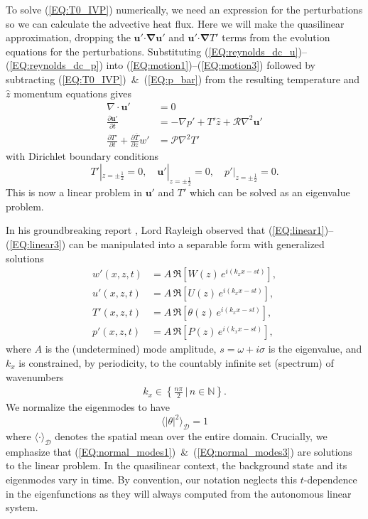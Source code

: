 \documentclass[reprint,amsmath,amssymb,aps,nofootinbib]{revtex4-1}
\renewcommand{\vec}[1]{\boldsymbol{#1}}
\newcommand{\eq}[1]{(\ref{#1})}
\newcommand{\eqs}[2]{(\ref{#1})~\&~(\ref{#2})}
\newcommand{\eqss}[2]{(\ref{#1})--(\ref{#2})}
\begin{document}
To solve \eq{EQ:T0_IVP} numerically, we need an expression for the perturbations so we can calculate the advective heat flux.
Here we will make the quasilinear approximation, dropping the $\vec{u}'\vec{\cdot}\vec{\nabla}\vec{u}'$ and $\vec{u}'\vec{\cdot}\vec{\nabla}T'$ terms from the evolution equations for the perturbations.
Substituting \eqss{EQ:reynolds_dc_u}{EQ:reynolds_dc_p} into \eqss{EQ:motion1}{EQ:motion3} followed by subtracting \eqs{EQ:T0_IVP}{EQ:p_bar} from the resulting temperature and $\hat{z}$ momentum equations gives
\begin{align}
    \nabla \cdot \vec{u'} &= 0 \label{EQ:linear1}\\
    \frac{\partial\vec{u'}}{\partial t} &= - \nabla p' + T'\hat{z} + \mathcal{R} \nabla^2 \vec{u'} \label{EQ:linear2}\\
    \frac{\partial T'}{\partial t} + \frac{\partial \overline{T}}{\partial z} w' &= \mathcal{P} \nabla^2 T' \label{EQ:linear3}
\end{align}
with Dirichlet boundary conditions 
\begin{equation}
    T'|_{z = \pm \frac{1}{2}} = 0, \quad \vec{u'}|_{z = \pm \frac{1}{2}} = 0, \quad p'|_{z = \pm \frac{1}{2}} = 0.
\end{equation}
This is now a linear problem in $\vec{u}'$ and $T'$ which can be solved as an eigenvalue problem.

In his groundbreaking report \cite{Rayleigh_1916}, Lord Rayleigh observed that \eqss{EQ:linear1}{EQ:linear3} can be manipulated into a separable form with generalized solutions
\begin{align}
    w'(x, z, t) &= A\, \Re\left[W(z) \, e^{i(k_xx-st)}\right], \label{EQ:normal_modes1}\\ 
    u'(x, z, t) &= A\, \Re\left[U(z) \, e^{i(k_xx-st)}\right], \label{EQ:normal_modes2}\\ 
    T'(x, z, t) &= A\, \Re\left[\theta(z) \, e^{i(k_xx-st)}\right], \label{EQ:normal_modes3}\\ 
    p'(x, z, t) &= A\, \Re\left[P(z) \, e^{i(k_xx-st)}\right], \label{EQ:normal_modes4}
\end{align}
where $A$ is the (undetermined) mode amplitude, $s = \omega + i\sigma$ is the eigenvalue, and $k_x$ is constrained, by periodicity, to the countably infinite set (spectrum) of wavenumbers
\begin{align}
    k_x \in \left\{\frac{n\pi}{2} \, \big| \, n \in \mathbb{N}\right\}.
\end{align}
We normalize the eigenmodes to have
\begin{equation}
  \langle |\theta|^2 \rangle_{\mathcal{D}} = 1
\end{equation}
where $\langle \cdot \rangle_{\mathcal{D}}$ denotes the spatial mean over the entire domain.
Crucially, we emphasize that  \eqs{EQ:normal_modes1}{EQ:normal_modes3} are solutions to the linear problem.
In the quasilinear context, the background state and its eigenmodes vary in time.
By convention, our notation neglects this $t$-dependence in the eigenfunctions as they will always computed from the autonomous linear system.
\end{document}
